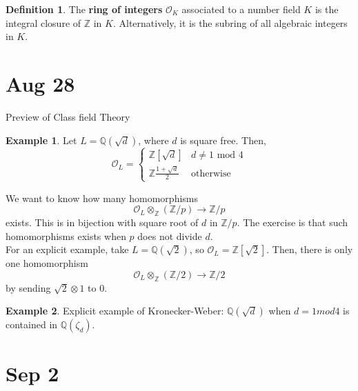 \documentclass{article}
\theoremstyle{definition}
\theoremstyle{definition}
\newtheorem{definition}{Definition}[theorem]
\theoremstyle{definition}
\theoremstyle{definition}
\theoremstyle{definition}
\theoremstyle{definition}
\theoremstyle{definition}
\newtheorem{example}{Example}[theorem]
\begin{document}
\begin{tcolorbox}[colback=purple!5!white,colframe=purple!75!black]
\begin{definition}
The \textbf{ring of integers} $\mathcal{O}_K$ associated to a number field $K$ is the integral closure of $\mathbb{Z}$ in $K$. Alternatively, it is the subring of all algebraic integers in $K$. 
\end{definition}
\end{tcolorbox}


\section{Aug 28}

Preview of Class field Theory

\begin{tcolorbox}[colback=yellow!5!white,colframe=yellow!30!white]
\begin{example}
Let $L=\mathbb{Q}(\sqrt{d})$, where $d$ is square free. Then, 
\[\mathcal{O}_L=\begin{cases}
    \mathbb{Z}[\sqrt{d}] & d\neq 1 \textrm{ mod } 4\\
    \mathbb{Z}{\frac{1+\sqrt{d}}{2}} & \textrm{otherwise}
\end{cases}\]

We want to know how many homomorphisms 
\[\mathcal{O}_L\otimes_{\mathbb{Z}} (\mathbb{Z}/p)\to \mathbb{Z}/p\]
exists. This is in bijection with square root of $d$ in $\mathbb{Z}/p$. The exercise is that such homomorphisms exists when $p$ does not divide $d$. \\

For an explicit example, take $L=\mathbb{Q}(\sqrt{2})$, so $\mathcal{O}_L= \mathbb{Z}[\sqrt{2}]$. Then, there is only one homomorphism 
\[\mathcal{O}_L\otimes_{\mathbb{Z}} (\mathbb{Z}/2)\to \mathbb{Z}/2\]
by sending $\sqrt{2}\otimes 1$ to $0$. 

\end{example}
\end{tcolorbox}


\begin{tcolorbox}[colback=yellow!5!white,colframe=yellow!30!white]
\begin{example}
Explicit example of Kronecker-Weber: $\mathbb{Q}(\sqrt{d})$ when $d=1 mod 4$  is contained in $\mathbb{Q}(\zeta_d)$. 
\end{example}
\end{tcolorbox}

\section{Sep 2}
\end{document}
